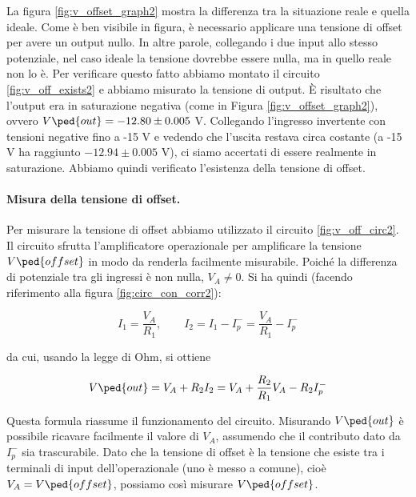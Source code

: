 La figura \ref{fig:v_offset_graph2} mostra la differenza tra la situazione reale e quella
ideale. Come è ben visibile in figura, è necessario applicare una tensione di offset per
avere un output nullo. In altre parole, collegando i due input allo stesso potenziale,
nel caso ideale la tensione dovrebbe essere nulla, ma in quello reale non lo è.
Per verificare questo fatto abbiamo montato il circuito \ref{fig:v_off_exists2} e abbiamo misurato
la tensione di output. È risultato che l'output era in saturazione negativa (come in Figura \ref{fig:v_offset_graph2}),
ovvero $V\ped{out} = -12.80 \pm 0.005$ V. Collegando l'ingresso invertente con tensioni negative fino a -15 V
e vedendo che l'uscita restava circa costante (a -15 V ha raggiunto $-12.94 \pm 0.005$ V),
ci siamo accertati di essere realmente in saturazione. Abbiamo quindi verificato l'esistenza
della tensione di offset.

\paragraph{Misura della tensione di offset.}

Per misurare la tensione di offset abbiamo utilizzato il circuito \ref{fig:v_off_circ2}.
Il circuito sfrutta l'amplificatore operazionale per amplificare la tensione $V\ped{offset}$
in modo da renderla facilmente misurabile.
Poiché la differenza di potenziale tra gli ingressi è non nulla, 
$V_A \neq 0$. Si ha quindi (facendo riferimento alla figura \ref{fig:circ_con_corr2}):

\begin{equation}
    I_1  = \frac{V_A}{R_1}, \qquad I_2 = I_1 - I_p^- = \frac{V_A}{R_1} - I_p^-
\end{equation}

da cui, usando la legge di Ohm, si ottiene

\begin{equation}
    V\ped{out} = V_A + R_2 I_2 = V_A + \frac{R_2}{R_1} V_A - R_2 I_p^-
    \label{eq:law2}
\end{equation}

Questa formula riassume il funzionamento del circuito. Misurando $V\ped{out}$ è possibile
ricavare facilmente il valore di $V_A$, assumendo che il contributo dato da $I_p^-$ sia trascurabile.
Dato che la tensione di offset è la tensione che esiste tra i terminali
di input dell'operazionale (uno è messo a comune), cioè $V_A = V\ped{offset}$, possiamo così misurare $V\ped{offset}$.

